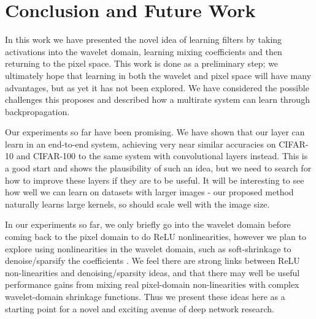 \section{Conclusion and Future Work}
In this work we have presented the novel idea of learning filters by taking
activations into the wavelet domain, learning mixing coefficients and then
returning to the pixel space. This work is done as a preliminary step; we
ultimately hope that learning in both the wavelet and pixel space will have many
advantages, but as yet it has not been explored. We have considered the possible
challenges this proposes and described how a multirate system can learn through
backpropagation.  

Our experiments so far have been promising. We have shown that our layer can
learn in an end-to-end system, achieving very near similar accuracies on
CIFAR-10 and CIFAR-100 to the same system with convolutional layers instead.
This is a good start and shows the plausibility of such an idea, but we need to
search for how to improve these layers if they are to be useful.  It will be
interesting to see how well we can learn on datasets with larger images - our
proposed method naturally learns large kernels, so should scale well with the
image size.

In our experiments so far, we only briefly go into the wavelet domain before
coming back to the pixel domain to do ReLU nonlinearities, however we plan to
explore using nonlinearities in the wavelet domain, such as soft-shrinkage to
denoise/sparsify the coefficients \cite{donoho_ideal_1994}. We feel there are
strong links between ReLU non-linearities and denoising/sparsity ideas, and that
there may well be useful performance gains from mixing real pixel-domain
non-linearities with complex wavelet-domain shrinkage functions. Thus we present
these ideas here as a starting point for a novel and exciting avenue of deep
network research.

